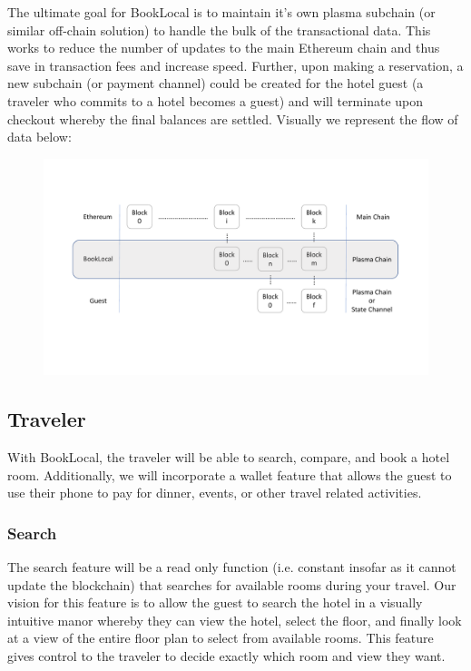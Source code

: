 \documentclass{article}
\begin{document}
\begin{flushleft}
The ultimate goal for BookLocal is to maintain it's own plasma subchain (or similar off-chain solution) to handle the bulk of the transactional data. This works to reduce the number of updates to the main Ethereum chain and thus save in transaction fees and increase speed. Further, upon making a reservation, a new subchain (or payment channel) could be created for the hotel guest (a traveler who commits to a hotel becomes a guest) and will terminate upon checkout whereby the final balances are settled. Visually we represent the flow of data below:
\end{flushleft}

\begin{figure}[H]
\centering
\includegraphics[width = \textwidth]{bookLocal_dataLayers.pdf}
\end{figure}

\subsection{Traveler}
With BookLocal, the traveler will be able to search, compare, and book a hotel room. Additionally, we will incorporate a wallet feature that allows the guest to use their phone to pay for dinner, events, or other travel related activities.  

\subsubsection{Search}
The search feature will be a read only function (i.e. constant insofar as it cannot update the blockchain) that searches for available rooms during your travel. Our vision for this feature is to allow the guest to search the hotel in a visually intuitive manor whereby they can view the hotel, select the floor, and finally look at a view of the entire floor plan to select from available rooms. This feature gives control to the traveler to decide exactly which room and view they want. 
\end{document}

